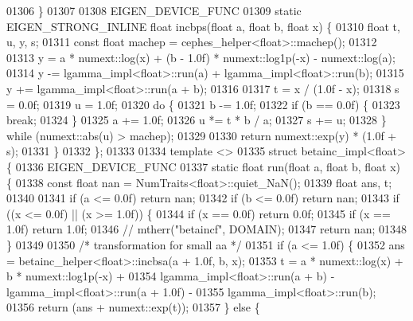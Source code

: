 \begin{DoxyCode}
01306   \}
01307 
01308   EIGEN\_DEVICE\_FUNC
01309   \textcolor{keyword}{static} EIGEN\_STRONG\_INLINE \textcolor{keywordtype}{float} incbps(\textcolor{keywordtype}{float} a, \textcolor{keywordtype}{float} b, \textcolor{keywordtype}{float} x) \{
01310     \textcolor{keywordtype}{float} t, u, y, s;
01311     \textcolor{keyword}{const} \textcolor{keywordtype}{float} machep = cephes\_helper<float>::machep();
01312 
01313     y = a * numext::log(x) + (b - 1.0f) * numext::log1p(-x) - numext::log(a);
01314     y -= lgamma\_impl<float>::run(a) + lgamma\_impl<float>::run(b);
01315     y += lgamma\_impl<float>::run(a + b);
01316 
01317     t = x / (1.0f - x);
01318     s = 0.0f;
01319     u = 1.0f;
01320     \textcolor{keywordflow}{do} \{
01321       b -= 1.0f;
01322       \textcolor{keywordflow}{if} (b == 0.0f) \{
01323         \textcolor{keywordflow}{break};
01324       \}
01325       a += 1.0f;
01326       u *= t * b / a;
01327       s += u;
01328     \} \textcolor{keywordflow}{while} (numext::abs(u) > machep);
01329 
01330     \textcolor{keywordflow}{return} numext::exp(y) * (1.0f + s);
01331   \}
01332 \};
01333 
01334 \textcolor{keyword}{template} <>
01335 \textcolor{keyword}{struct }betainc\_impl<float> \{
01336   EIGEN\_DEVICE\_FUNC
01337   \textcolor{keyword}{static} \textcolor{keywordtype}{float} run(\textcolor{keywordtype}{float} a, \textcolor{keywordtype}{float} b, \textcolor{keywordtype}{float} x) \{
01338     \textcolor{keyword}{const} \textcolor{keywordtype}{float} nan = NumTraits<float>::quiet\_NaN();
01339     \textcolor{keywordtype}{float} ans, t;
01340 
01341     \textcolor{keywordflow}{if} (a <= 0.0f) \textcolor{keywordflow}{return} nan;
01342     \textcolor{keywordflow}{if} (b <= 0.0f) \textcolor{keywordflow}{return} nan;
01343     \textcolor{keywordflow}{if} ((x <= 0.0f) || (x >= 1.0f)) \{
01344       \textcolor{keywordflow}{if} (x == 0.0f) \textcolor{keywordflow}{return} 0.0f;
01345       \textcolor{keywordflow}{if} (x == 1.0f) \textcolor{keywordflow}{return} 1.0f;
01346       \textcolor{comment}{// mtherr("betaincf", DOMAIN);}
01347       \textcolor{keywordflow}{return} nan;
01348     \}
01349 
01350     \textcolor{comment}{/* transformation for small aa */}
01351     \textcolor{keywordflow}{if} (a <= 1.0f) \{
01352       ans = betainc\_helper<float>::incbsa(a + 1.0f, b, x);
01353       t = a * numext::log(x) + b * numext::log1p(-x) +
01354           lgamma\_impl<float>::run(a + b) - lgamma\_impl<float>::run(a + 1.0f) -
01355           lgamma\_impl<float>::run(b);
01356       \textcolor{keywordflow}{return} (ans + numext::exp(t));
01357     \} \textcolor{keywordflow}{else} \{

\end{DoxyCode}
